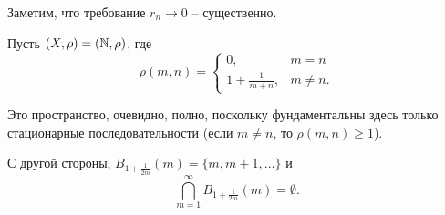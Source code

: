 \begin{note}
    Заметим, что требование $r_n \rightarrow 0$ -- существенно.

    Пусть $(X, \rho) = (\mathbb{N}, \rho)$, где
    \[
        \rho(m, n) =
        \begin{cases}
            0, & m = n \\
            1 + \frac{1}{m + n}, & m \neq n.
        \end{cases}
    \]

    Это пространство, очевидно, полно, поскольку фундаментальны здесь только стационарные последовательности (если $m \neq n$, то $\rho(m, n) \geq 1$).

    С другой стороны, $B_{1 + \frac{1}{2m}}(m) = \{m, m + 1, \ldots\}$ и
    \[
        \bigcap_{m = 1}^{\infty} B_{1 + \frac{1}{2m}}(m) = \emptyset.
    \]
\end{note}
